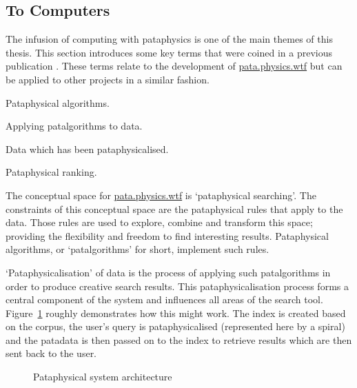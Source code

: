 \subsection{To Computers}
\label{s:pataputers}

The infusion of computing with pataphysics is one of the main themes of this thesis. This section introduces some key terms that were coined in a previous publication \autocite{Hugill2013d}. These terms relate to the development of \url{pata.physics.wtf} but can be applied to other projects in a similar fashion.

\begin{description}[leftmargin=4.5cm]
  \item [Patalgorithms] Pataphysical algorithms.
  \item [Pataphysicalisation] Applying patalgorithms to data.
  \item [Patadata] Data which has been pataphysicalised.
  \item [Pranking] Pataphysical ranking.
\end{description}

The conceptual space for \url{pata.physics.wtf} is `pataphysical searching'. The constraints of this conceptual space are the pataphysical rules that apply to the data. Those rules are used to explore, combine and transform this space; providing the flexibility and freedom to find interesting results. Pataphysical algorithms, or `patalgorithms' for short, implement such rules.

`Pataphysicalisation' of data is the process of applying such patalgorithms in order to produce creative search results. This pataphysicalisation process forms a central component of the system and influences all areas of the search tool. Figure~\ref{fig:patarc} roughly demonstrates how this might work. The index is created based on the corpus, the user's query is pataphysicalised (represented here by a spiral) and the patadata is then passed on to the index to retrieve results which are then sent back to the user.

\begin{figure}[!htbp]
  \centering
  \caption[Pataphysical system architecture]{Pataphysical system architecture}
  \label{fig:patarc}
\end{figure}

